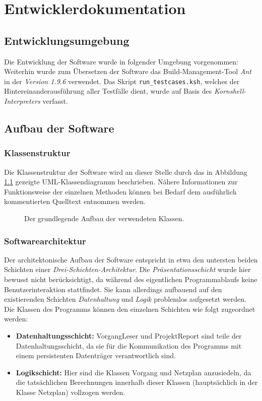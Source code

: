 \chapter{Entwicklerdokumentation}
\label{Entwicklerdokumentation}

\section{Entwicklungsumgebung}
Die Entwicklung der Software wurde in folgender Umgebung vorgenommen:
\makeenvironment
Weiterhin wurde zum \"Ubersetzen der Software das
Build-Management-Tool \textit{Ant} in der \textit{Version 1.9.6}
verwendet. Das Skript \texttt{run\_testcases.ksh}, welches der
Hintereinanderausf\"uhrung aller Testf\"alle dient, wurde auf Basis
des \textit{Kornshell-Interpreters} verfasst.

\section{Aufbau der Software}

\subsection{Klassenstruktur}

Die Klassenstruktur der Software wird an dieser Stelle durch das in
Abbildung \ref{klassendiagramm} gezeigte UML-Klassendiagramm
beschrieben. N\"ahere Informationen zur Funktionsweise der einzelnen
Methoden k\"onnen bei Bedarf dem ausf\"uhrlich kommentierten Quelltext
entnommen werden.

\begin{figure}
  \resizebox{\textwidth}{!}{
    
  }
  \caption{Der grundlegende Aufbau der verwendeten Klassen.}
  \label{klassendiagramm}
\end{figure}

\subsection{Softwarearchitektur}

Der architektonische Aufbau der Software entspricht in etwa den
untersten beiden Schichten einer
\textit{Drei-Schichten-Architektur}. Die
\textit{Pr\"asentationsschicht} wurde
hier bewusst nicht ber\"ucksichtigt, da w\"ahrend des eigentlichen
Programmablaufs keine Benutzerinteraktion stattfindet. Sie kann
allerdings aufbauend auf den existierenden Schichten
\textit{Datenhaltung} und \textit{Logik} problemlos aufgesetzt werden.
Die Klassen des Programms k\"onnen den einzelnen Schichten wie folgt
zugeordnet werden:
\begin{itemize}
  \item \textbf{Datenhaltungsschicht:} VorgangLeser und ProjektReport
    sind teile der Datenhaltungsschicht, da sie f\"ur die
    Kommunikation des Programms mit einem persistenten Datentr\"ager
    verantwortlich sind.
  \item \textbf{Logikschicht:} Hier sind die Klassen Vorgang und
    Netzplan anzusiedeln, da die tats\"achlichen Berechnungen
    innerhalb dieser Klassen (haupts\"achlich in der Klasse Netzplan)
    vollzogen werden.
\end{itemize}

